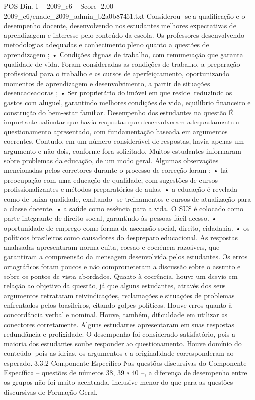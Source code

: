 \begin{textsample}{POS Dim 1 – 2009\_c6 – Score -2.00 – 2009\_c6/enade\_2009\_admin\_b2a0b87461.txt}
Considerou -se a qualificação e o desempenho docente, desenvolvendo nos estudantes melhores expectativas de aprendizagem e interesse pelo conteúdo da escola.
Os professores desenvolvendo metodologias adequadas e conhecimento pleno quanto a questões de aprendizagem ; • Condições dignas de trabalho, com remuneração que garanta qualidade de vida.
Foram consideradas as condições de trabalho, a preparação profissional para o trabalho e os cursos de aperfeiçoamento, oportunizando momentos de aprendizagem e desenvolvimento, a partir de situações desencadeadoras ; • Ser proprietário do imóvel em que reside, reduzindo os gastos com aluguel, garantindo melhores condições de vida, equilíbrio financeiro e construção do bem-estar familiar.
Desempenho dos estudantes na questão É importante salientar que havia respostas que desenvolveram adequadamente o questionamento apresentado, com fundamentação baseada em argumentos coerentes.
Contudo, em um número considerável de respostas, havia apenas um argumento e não dois, conforme fora solicitado.
Muitos estudantes informaram sobre problemas da educação, de um modo geral.
Algumas observações mencionadas pelos corretores durante o processo de correção foram : • há preocupação com uma educação de qualidade, com sugestões de cursos profissionalizantes e métodos preparatórios de aulas. • a educação é revelada como de baixa qualidade, exaltando -se treinamentos e cursos de atualização para a classe docente. • a saúde como essência para a vida.
O SUS é colocado como parte integrante de direito social, garantindo às pessoas fácil acesso. • oportunidade de emprego como forma de ascensão social, direito, cidadania. • os políticos brasileiros como causadores do despreparo educacional.
As respostas analisadas apresentaram norma culta, coesão e coerência razoáveis, que garantiram a compreensão da mensagem desenvolvida pelos estudantes.
Os erros ortográficos foram poucos e não comprometeram a discussão sobre o assunto e sobre os pontos de vista abordados.
Quanto à coerência, houve um desvio em relação ao objetivo da questão, já que alguns estudantes, através dos seus argumentos retrataram reivindicações, reclamações e situações de problemas enfrentados pelos brasileiros, citando golpes políticos.
Houve erros quanto à concordância verbal e nominal.
Houve, também, dificuldade em utilizar os conectores corretamente.
Alguns estudantes apresentaram em suas respostas redundância e prolixidade.
O desempenho foi considerado satisfatório, pois a maioria dos estudantes soube responder ao questionamento.
Houve domínio do conteúdo, pois as ideias, os argumentos e a originalidade corresponderam ao esperado. 3.3.2 Componente Específico Nas questões discursivas do Componente Específico – questões de números 38, 39 e 40 –, a diferença de desempenho entre os grupos não foi muito acentuada, inclusive menor do que para as questões discursivas de Formação Geral.

\end{textsample}
